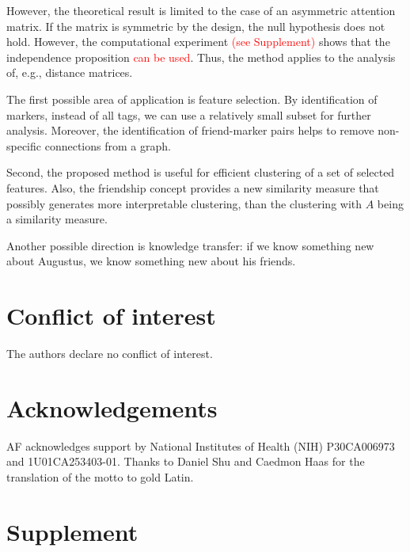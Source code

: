 \documentclass{llncs}
\begin{document}
However, the theoretical result is limited to the case of an asymmetric attention matrix. If the matrix is symmetric by the design, the null hypothesis does not hold. However, the computational experiment \textcolor{red}{(see Supplement)} shows that the independence proposition \textcolor{red}{can be used}. Thus, the method applies to the analysis of, e.g., distance matrices. 

The first possible area of application is feature selection. By identification of markers, instead of all tags, we can use a relatively small subset for further analysis. Moreover, the identification of friend-marker pairs helps to remove non-specific connections from a graph. 

Second, the proposed method is useful for efficient clustering of a set of selected features. Also, the friendship concept provides a new similarity measure that possibly generates more interpretable clustering, than the clustering with $A$ being a similarity measure.

Another possible direction is knowledge transfer: if we know something new about Augustus, we know something new about his friends. 



\section{Conflict of interest}
The authors declare no conflict of interest.

\section{Acknowledgements}
AF acknowledges support by National Institutes of Health (NIH) P30CA006973 and 1U01CA253403-01.
Thanks to Daniel Shu and Caedmon Haas for the translation of the motto to gold Latin. 





\newcommand{\beginsupplement}{%
 \setcounter{table}{0}
 \renewcommand{\thetable}{S\arabic{table}}%
 \setcounter{figure}{0}
 \renewcommand{\thefigure}{S\arabic{figure}}
 \setcounter{equation}{0}
 \renewcommand{\theequation}{S\arabic{equation}}%
 }

\newpage
\section*{Supplement}
\beginsupplement
\end{document}
